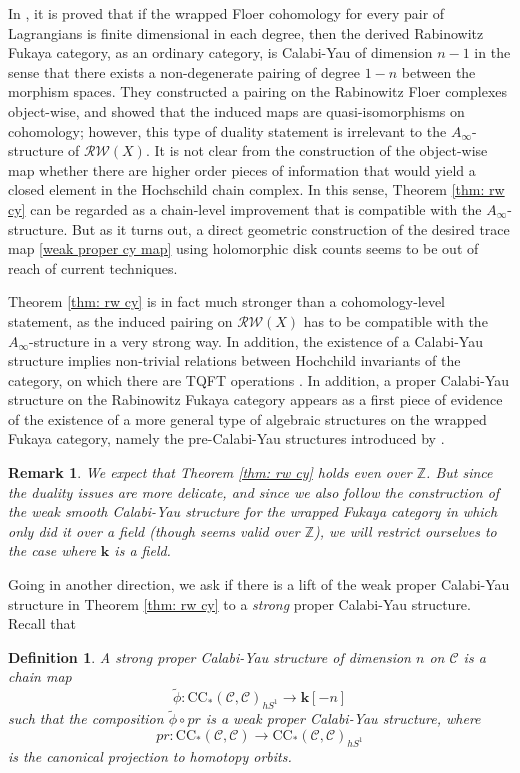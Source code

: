 \documentclass[11pt]{amsproc}
\def\Z{{\mathbb Z}}
\def\K{{\mathbf{k}}}
\def\cc{\mathcal{C}}
\def\r#1{\mathrm{#1}}
\def\rw{\mathcal{RW}}
\def\ainf{A_\infty}
\newtheorem{defn}[lem]{Definition}
\newtheorem{rem}[lem]{Remark}
\theoremstyle{remark}
\numberwithin{equation}{section}
\begin{document}
In \cite{BJK}, it is proved that if the wrapped Floer cohomology for every pair of Lagrangians is finite dimensional in each degree,
then the derived Rabinowitz Fukaya category, as an ordinary category, 
is Calabi-Yau of dimension $n-1$ in the sense that there exists a non-degenerate pairing of degree $1-n$ between the morphism spaces.
They constructed a pairing on the Rabinowitz Floer complexes object-wise,
and showed that the induced maps are quasi-isomorphisms on cohomology;
however, this type of duality statement is irrelevant to the $\ainf$-structure of $\rw(X)$.
It is not clear from the construction of the object-wise map whether there are higher order pieces of information that would yield a closed element in the Hochschild chain complex.
In this sense, Theorem \ref{thm: rw cy} can be regarded as a chain-level improvement that is compatible with the $\ainf$-structure.
But as it turns out, a direct geometric construction of the desired trace map \eqref{weak proper cy map} using holomorphic disk counts seems to be out of reach of current techniques.

Theorem \ref{thm: rw cy} is in fact much stronger than a cohomology-level statement,
as the induced pairing on $\rw(X)$ has to be compatible with the $\ainf$-structure in a very strong way.
In addition, the existence of a Calabi-Yau structure implies non-trivial relations between Hochchild invariants of the category, 
on which there are TQFT operations \cite{kontsevich-takeda-vlassopoulos}.
In addition, a proper Calabi-Yau structure on the Rabinowitz Fukaya category appears as a first piece of evidence of the existence of a more general type of algebraic structures on the wrapped Fukaya category,
namely the pre-Calabi-Yau structures introduced by \cite{kontsevich-takeda-vlassopoulos}.

\begin{rem}
We expect that Theorem \ref{thm: rw cy} holds even over $\Z$.
But since the duality issues are more delicate, 
and since we also follow the construction of the weak smooth Calabi-Yau structure for the wrapped Fukaya category in \cite{ganatra} which only did it over a field (though seems valid over $\Z$),
we will restrict ourselves to the case where $\K$ is a field.
\end{rem}

Going in another direction, we ask if there is a lift of the weak proper Calabi-Yau structure in Theorem \ref{thm: rw cy} to a {\it strong} proper Calabi-Yau structure.
Recall that 

\begin{defn}
A strong proper Calabi-Yau structure of dimension $n$ on $\cc$ is a chain map
\begin{equation}
\tilde{\phi}: \r{CC}_{*}(\cc, \cc)_{hS^{1}} \to \K[-n]
\end{equation}
such that the composition $\tilde{\phi} \circ pr$ is a weak proper Calabi-Yau structure,
where 
\begin{equation}
pr: \r{CC}_{*}(\cc, \cc) \to \r{CC}_{*}(\cc, \cc)_{hS^{1}}
\end{equation}
is the canonical projection to homotopy orbits.
\end{defn}
\end{document}
